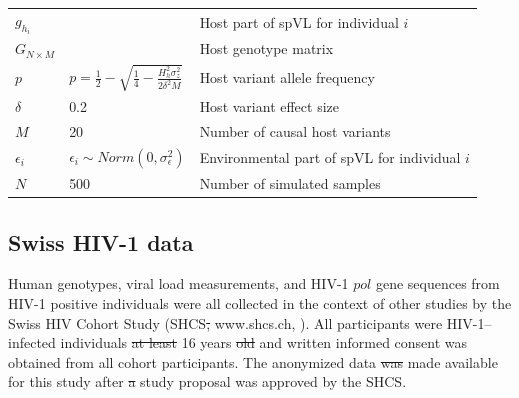 \documentclass[11pt]{article} %
\providecommand{\DIFadd}[1]{{\protect\color{blue}\uwave{#1}}} %
\providecommand{\DIFdel}[1]{{\protect\color{red}\sout{#1}}}                      %
\providecommand{\DIFaddbegin}{} %
\providecommand{\DIFaddend}{} %
\providecommand{\DIFdelbegin}{} %
\providecommand{\DIFdelend}{} %
\newcommand{\DIFscaledelfig}{0.5}
\newlength{\DIFdelgraphicswidth} %
\newlength{\DIFdelgraphicsheight} %
\newcommand{\DIFaddincludegraphics}[2][]{{\color{blue}\fbox{\DIFOincludegraphics[#1]{#2}}}} %
\newcommand{\DIFdelincludegraphics}[2][]{%
\sbox{\DIFdelgraphicsbox}{\DIFOincludegraphics[#1]{#2}}%
\settoboxwidth{\DIFdelgraphicswidth}{\DIFdelgraphicsbox} %
\settoboxtotalheight{\DIFdelgraphicsheight}{\DIFdelgraphicsbox} %
\scalebox{\DIFscaledelfig}{%
\parbox[b]{\DIFdelgraphicswidth}{\usebox{\DIFdelgraphicsbox}\\[-\baselineskip] \rule{\DIFdelgraphicswidth}{0em}}\llap{\resizebox{\DIFdelgraphicswidth}{\DIFdelgraphicsheight}{%
\setlength{\unitlength}{\DIFdelgraphicswidth}%
\begin{picture}(1,1)%
\thicklines\linethickness{2pt} %
{\color[rgb]{1,0,0}\put(0,0){\framebox(1,1){}}}%
{\color[rgb]{1,0,0}\put(0,0){\line( 1,1){1}}}%
{\color[rgb]{1,0,0}\put(0,1){\line(1,-1){1}}}%
\end{picture}%
}\hspace*{3pt}}} %
} %
\DeclareRobustCommand{\DIFaddbegin}{\DIFOaddbegin \let\includegraphics\DIFaddincludegraphics} %
\DeclareRobustCommand{\DIFaddend}{\DIFOaddend \let\includegraphics\DIFOincludegraphics} %
\DeclareRobustCommand{\DIFdelbegin}{\DIFOdelbegin \let\includegraphics\DIFdelincludegraphics} %
\DeclareRobustCommand{\DIFdelend}{\DIFOaddend \let\includegraphics\DIFOincludegraphics} %
\begin{document}
\begin{linenumbers}
\begin{table}[H]
\begin{tabularx}{\linewidth}{p{1.5cm}ll}
		$g_{h_i}$ & \makecell{$g_{h_i} = \delta \sum_{j = 1}^{j = M/2}{G_{ij}} - \\ \delta \sum_{j = M/2}^{j = M}{G_{ij}}$} & Host part of spVL for individual $i$ \\ 
		$G_{N \times M}$ & \makecell{$G_{ij} \sim Binom(2, p)\ \\ \forall i \in {1...N}, \forall j \in {1...M}$} & Host genotype matrix \\
		$p$ & $p = \frac{1}{2} - \sqrt{\frac{1}{4} - \frac{H_{h}^2\sigma^2_z}{2\delta^2M}}$ &  Host variant allele frequency \\ 
		$\delta$ & 0.2 & Host variant effect size \\ 
		$M$ & 20 & Number of causal host variants \\ 
		$\epsilon_i$ & $ \epsilon_i \sim Norm(0, \sigma^2_{\epsilon})$ & Environmental part of spVL for individual $i$ \\ 
		$N$ & 500 & Number of simulated samples \\ \bottomrule 
	\end{tabularx}
	\label{tab:sim-params}
\end{table}

\subsection*{Swiss HIV-1 data}

Human genotypes, viral load measurements, and HIV-1 $pol$ gene sequences from HIV-1 positive individuals were all collected in the context of other studies by the Swiss HIV Cohort Study (SHCS\DIFdelbegin \DIFdel{, }\DIFdelend \DIFaddbegin \DIFadd{) (}\DIFaddend www.shcs.ch, \citet{Schoeni-Affolter2010, Scherrer2021CohortSHCS}). All participants were HIV-1–infected individuals \DIFdelbegin \DIFdel{at least }\DIFdelend 16 years \DIFdelbegin \DIFdel{old }\DIFdelend \DIFaddbegin \DIFadd{or older }\DIFaddend and written informed consent was obtained from all cohort participants. The anonymized data \DIFdelbegin \DIFdel{was }\DIFdelend \DIFaddbegin \DIFadd{were }\DIFaddend made available for this study after \DIFdelbegin \DIFdel{a }\DIFdelend \DIFaddbegin \DIFadd{the }\DIFaddend study proposal was approved by the SHCS. 


\end{linenumbers}
\end{document}
